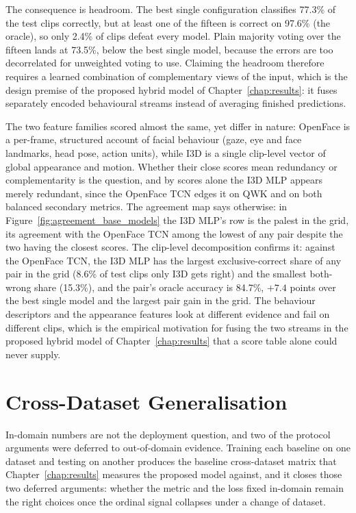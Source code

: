 \documentclass[../main.tex]{subfiles}
\begin{document}
The consequence is headroom. The best single configuration classifies 77.3\% of the test clips correctly, but at least one of the fifteen is correct on 97.6\% (the oracle), so only 2.4\% of clips defeat every model. Plain majority voting over the fifteen lands at 73.5\%, below the best single model, because the errors are too decorrelated for unweighted voting to use. Claiming the headroom therefore requires a learned combination of complementary views of the input, which is the design premise of the proposed hybrid model of Chapter~\ref{chap:results}: it fuses separately encoded behavioural streams instead of averaging finished predictions.

The two feature families scored almost the same, yet differ in nature: OpenFace is a per-frame, structured account of facial behaviour (gaze, eye and face landmarks, head pose, action units), while I3D is a single clip-level vector of global appearance and motion. Whether their close scores mean redundancy or complementarity is the question, and by scores alone the I3D MLP appears merely redundant, since the OpenFace TCN edges it on QWK and on both balanced secondary metrics. The agreement map says otherwise: in Figure~\ref{fig:agreement_base_models} the I3D MLP's row is the palest in the grid, its agreement with the OpenFace TCN among the lowest of any pair despite the two having the closest scores. The clip-level decomposition confirms it: against the OpenFace TCN, the I3D MLP has the largest exclusive-correct share of any pair in the grid (8.6\% of test clips only I3D gets right) and the smallest both-wrong share (15.3\%), and the pair's oracle accuracy is 84.7\%, $+7.4$ points over the best single model and the largest pair gain in the grid. The behaviour descriptors and the appearance features look at different evidence and fail on different clips, which is the empirical motivation for fusing the two streams in the proposed hybrid model of Chapter~\ref{chap:results} that a score table alone could never supply.

\FloatBarrier
\section{Cross-Dataset Generalisation}
\label{sec:crossdomain}

In-domain numbers are not the deployment question, and two of the protocol arguments were deferred to out-of-domain evidence. Training each baseline on one dataset and testing on another produces the baseline cross-dataset matrix that Chapter~\ref{chap:results} measures the proposed model against, and it closes those two deferred arguments: whether the metric and the loss fixed in-domain remain the right choices once the ordinal signal collapses under a change of dataset.
\end{document}
